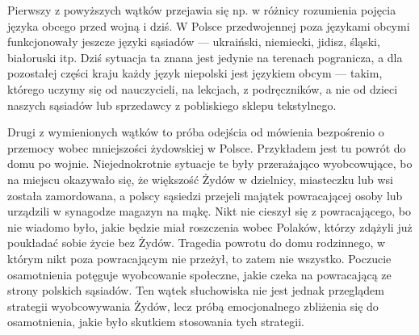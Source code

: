 \documentclass[11pt,a4paper,oneside]{article}
\begin{document}
Pierwszy z powyższych wątków przejawia się np. w różnicy rozumienia pojęcia
języka obcego przed wojną i dziś.  W Polsce przedwojennej poza językami obcymi
funkcjonowały jeszcze języki sąsiadów --- ukraiński, niemiecki, jidisz, śląski,
białoruski itp. Dziś sytuacja ta znana jest jedynie na terenach pogranicza,
a dla pozostałej części kraju każdy język niepolski jest językiem obcym ---
takim, którego uczymy się od nauczycieli, na lekcjach, z podręczników, a nie 
od dzieci naszych sąsiadów lub sprzedawcy z pobliskiego sklepu tekstylnego. 

\hspace{1em}Drugi z wymienionych wątków to próba odejścia od mówienia
bezpośrenio o przemocy wobec mniejszości żydowskiej w Polsce. Przykładem jest
tu powrót do domu po wojnie. Niejednokrotnie sytuacje te były przerażająco
wyobcowujące, bo na miejscu okazywało się, że większość Żydów w dzielnicy,
miasteczku lub wsi została zamordowana, a polscy sąsiedzi przejeli majątek
powracającej osoby lub urządzili w synagodze magazyn na mąkę. Nikt nie cieszył
się z powracającego, bo nie wiadomo było, jakie będzie miał roszczenia wobec
Polaków, którzy zdążyli już poukładać sobie życie bez Żydów. Tragedia powrotu
do domu rodzinnego, w którym nikt poza powracającym nie przeżył, to zatem nie
wszystko. Poczucie osamotnienia potęguje wyobcowanie społeczne, jakie czeka na
powracającą ze strony polskich sąsiadów. Ten wątek słuchowiska nie jest jednak przeglądem
strategii wyobcowywania Żydów, lecz próbą emocjonalnego zbliżenia się do
osamotnienia, jakie było skutkiem stosowania tych strategii. 
\end{document}

